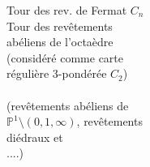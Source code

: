 \begin{flushright}
Tour des rev. de Fermat $C_n$\\
Tour des revêtements\\
abéliens de l'octaèdre\\
(considéré comme carte\\
régulière 3-pondérée $C_2$)\\
\\
(revêtements abéliens de\\
$\mathbb P^1\setminus(0,1,\infty)$, revêtements\\
diédraux et \\
....)
\end{flushright}
